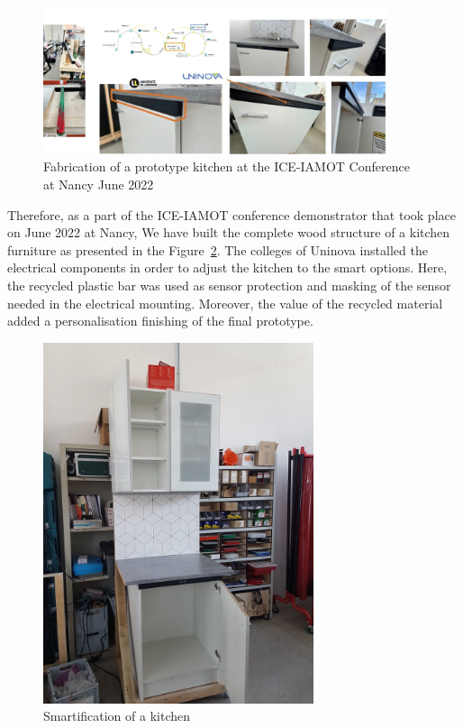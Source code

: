 \documentclass[
  11pt,
]{article}
\begin{document}
\begin{figure}[H]

{\centering \includegraphics[width=0.9\textwidth,height=\textheight]{figures/demos/Uninova/Uninova-01.jpg}

}

\caption{\label{fig-uninova}Fabrication of a prototype kitchen at the
ICE-IAMOT Conference at Nancy June 2022}

\end{figure}

Therefore, as a part of the ICE-IAMOT conference demonstrator that took
place on June 2022 at Nancy, We have built the complete wood structure
of a kitchen furniture as presented in the Figure~\ref{fig-uninova-00}.
The colleges of Uninova installed the electrical components in order to
adjust the kitchen to the smart options. Here, the recycled plastic bar
was used as sensor protection and masking of the sensor needed in the
electrical mounting. Moreover, the value of the recycled material added
a personalisation finishing of the final prototype.

\begin{figure}[H]

{\centering \includegraphics[width=3.125in,height=\textheight]{figures/demos/Uninova/uninova-00.jpg}

}

\caption{\label{fig-uninova-00}Smartification of a kitchen}

\end{figure}
\end{document}
